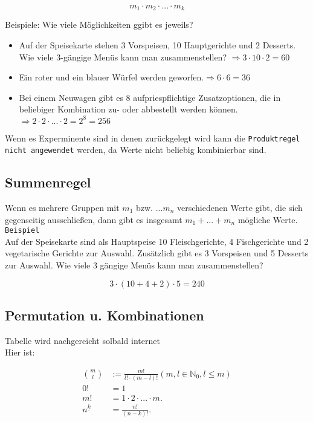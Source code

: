 \[m_1\cdot m_2 \cdot ... \cdot m_k\]

Beispiele: Wie viele Möglichkeiten ggibt es jeweils?\\

\begin{itemize}
    \item Auf der Speisekarte stehen 3 Vorspeisen, 10 Hauptgerichte und 2 Desserts. Wie viele 3-gängige Menüs kann man zusammenstellen? $\Longrightarrow 3\cdot 10\cdot 2 = 60$
    \item Ein roter und ein blauer Würfel werden geworfen.$\Longrightarrow 6\cdot 6=36$
    \item Bei einem Neuwagen gibt es 8 aufpriespflichtige Zusatzoptionen, die in beliebiger Kombination zu- oder abbestellt werden können.$\Longrightarrow 2\cdot 2\cdot ...\cdot 2 = 2^8=256$
\end{itemize}

Wenn es Experminente sind in denen zurückgelegt wird kann die \texttt{Produktregel nicht angewendet} werden, da Werte nicht beliebig kombinierbar sind.


\subsection{Summenregel}

Wenn es mehrere Gruppen mit $m_1$ bzw. $...m_n$ verschiedenen Werte gibt, die sich gegenseitig ausschließen, dann gibt es insgesamt $m_1+...+m_n$ mögliche Werte.\\

\texttt{Beispiel}\\
Auf der Speisekarte sind als Hauptspeise 10 Fleischgerichte, 4 Fischgerichte und 2 vegetarische Gerichte zur Auswahl. Zusätzlich gibt es 3 Vorspeisen und 5 Desserts zur Auswahl. Wie viele 3 gängige Menüs kann man zusammenstellen?

\[3\cdot (10+4+2)\cdot 5=240\]

\subsection{Permutation u. Kombinationen}

Tabelle wird nachgereicht solbald internet\\

Hier ist:

\begin{align}
    \binom{m}{l}&:=\frac{m!}{l!\cdot (m-l)!} (m,l\in\mathbb{N}_0,l\leq m)\\
    0!&=1\\
    m!&=1\cdot 2\cdot ...\cdot m.\\
    n^{\underline{k}}&=\frac{n!}{(n-k)!}.  
\end{align}

